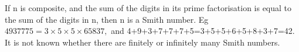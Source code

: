 If n is composite, and the sum of the digits in its prime
factorisation is equal to the sum of the digits in n, then n is a
Smith number.  Eg $ 4937775 = 3 \times 5 \times 5 \times 65837,$ and
4+9+3+7+7+7+5=3+5+5+6+5+8+3+7=42.
It is not known whether there are finitely or 
infinitely many Smith numbers.